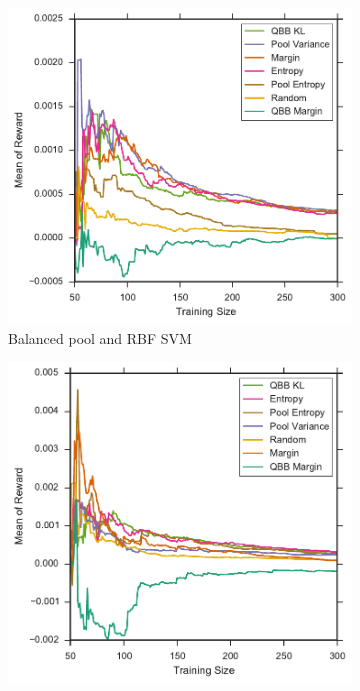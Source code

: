 \begin{figure}[p]
\begin{subfigure}{.5\textwidth}
		\includegraphics[width=\linewidth]{figures/5_thompson/sdss_br_avg_rewards}
		\caption{Balanced pool and RBF SVM}
		\label{fig:sdss_br_avg_rewards}
	\end{subfigure}
	\begin{subfigure}{.5\textwidth}
		\centering
		\includegraphics[width=\textwidth]{figures/5_thompson/sdss_ul_avg_rewards}

\end{subfigure}
\end{figure}
